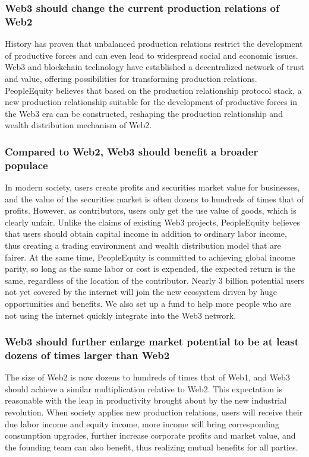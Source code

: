 \documentclass{article}
\begin{document}
\subsubsection{Web3 should change the current production relations of Web2}

History has proven that unbalanced production relations restrict the development of productive forces and can even lead to widespread social and economic issues. Web3 and blockchain technology have established a decentralized network of trust and value, offering possibilities for transforming production relations. PeopleEquity believes that based on the production relationship protocol stack, a new production relationship suitable for the development of productive forces in the Web3 era can be constructed, reshaping the production relationship and wealth distribution mechanism of Web2.

\subsubsection{Compared to Web2, Web3 should benefit a broader populace}

In modern society, users create profits and securities market value for businesses, and the value of the securities market is often dozens to hundreds of times that of profits. However, as contributors, users only get the use value of goods, which is clearly unfair. Unlike the claims of existing Web3 projects, PeopleEquity believes that users should obtain capital income in addition to ordinary labor income, thus creating a trading environment and wealth distribution model that are fairer. At the same time, PeopleEquity is committed to achieving global income parity, so long as the same labor or cost is expended, the expected return is the same, regardless of the location of the contributor. Nearly 3 billion potential users not yet covered by the internet will join the new ecosystem driven by huge opportunities and benefits. We also set up a fund to help more people who are not using the internet quickly integrate into the Web3 network.

\subsubsection{Web3 should further enlarge market potential to be at least dozens of times larger than Web2}

The size of Web2 is now dozens to hundreds of times that of Web1, and Web3 should achieve a similar multiplication relative to Web2. This expectation is reasonable with the leap in productivity brought about by the new industrial revolution. When society applies new production relations, users will receive their due labor income and equity income, more income will bring corresponding consumption upgrades, further increase corporate profits and market value, and the founding team can also benefit, thus realizing mutual benefits for all parties.
\end{document}
